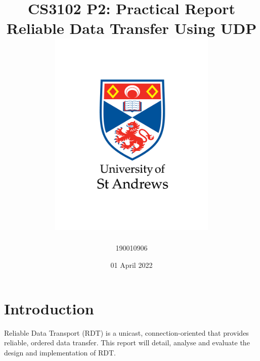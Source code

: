 \documentclass[12pt]{article}
\title{
{CS3102 P2: Practical Report}\\
{\large Reliable Data Transfer Using UDP}\\
{\includegraphics[width=80mm]{images/university-logo.png}}
}
\author{190010906}
\date{01 April 2022}
\begin{document}
\maketitle

\newpage

\section{Introduction}

Reliable Data Transport (RDT) is a unicast, connection-oriented that provides reliable, ordered data transfer. This report will detail, analyse and evaluate the design and implementation of RDT.











\newpage




\newpage

\end{document}
